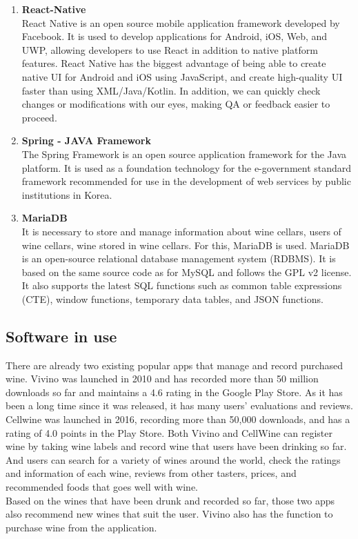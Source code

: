 \documentclass[sigconf, nonacm]{acmart}
\begin{document}
\begin{enumerate}
    \item \textbf{React-Native\\}
    React Native is an open source mobile application framework developed by Facebook. It is used to develop applications for Android, iOS, Web, and UWP, allowing developers to use React in addition to native platform features. React Native has the biggest advantage of being able to create native UI for Android and iOS using JavaScript, and create high-quality UI faster than using XML/Java/Kotlin. In addition, we can quickly check changes or modifications with our eyes, making QA or feedback easier to proceed. \\
    
    \item \textbf{Spring - JAVA Framework\\}
    The Spring Framework is an open source application framework for the Java platform. It is used as a foundation technology for the e-government standard framework recommended for use in the development of web services by public institutions in Korea.\\
    
    \item \textbf{MariaDB\\}
    It is necessary to store and manage information about wine cellars, users of wine cellars, wine stored in wine cellars. For this, MariaDB is used. MariaDB is an open-source relational database management system (RDBMS). It is based on the same source code as for MySQL and follows the GPL v2 license. It also supports the latest SQL functions such as common table expressions (CTE), window functions, temporary data tables, and JSON functions.
\end{enumerate}
\subsection{Software in use}
There are already two existing popular apps that manage and record purchased wine. Vivino was launched in 2010 and has recorded more than 50 million downloads so far and maintains a 4.6 rating in the Google Play Store. As it has been a long time since it was released, it has many users' evaluations and reviews.\\
Cellwine was launched in 2016, recording more than 50,000 downloads, and has a rating of 4.0 points in the Play Store. Both Vivino and CellWine can register wine by taking wine labels and record wine that users have been drinking so far. And users can search for a variety of wines around the world, check the ratings and information of each wine, reviews from other tasters, prices, and recommended foods that goes well with wine. \\
Based on the wines that have been drunk and recorded so far, those two apps also recommend new wines that suit the user. Vivino also has the function to purchase wine from the application.\\
\end{document}
